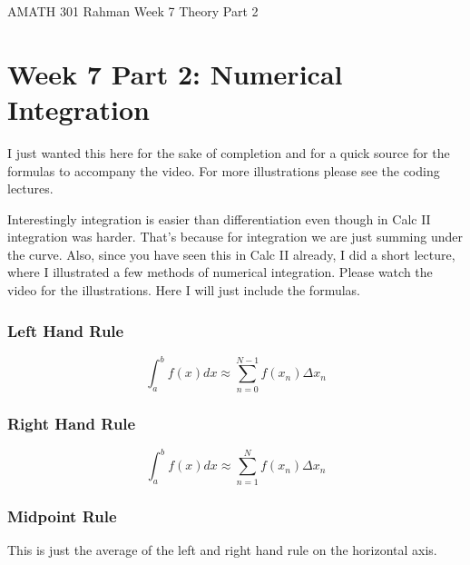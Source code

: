 \documentclass[reqno]{amsart}
\theoremstyle{definition}
\begin{document}
\begin{flushleft}
{\sc \Large AMATH 301 Rahman} \hfill Week 7 Theory Part 2
\bigskip
\end{flushleft}

\newcommand{\R}{\mathbb{R}}
\newcommand{\N}{\mathbb{N}}
\newcommand{\Z}{\mathbb{Z}}
\newcommand{\Q}{\mathbb{Q}}
\renewcommand{\CancelColor}{\color{red}}
\newcommand{\?}{\stackrel{?}{=}}
\renewcommand{\varphi}{\phi}
\newcommand{\card}{\text{Card}}
\newcommand{\bigzero}{\text{\Huge 0}}
\newcommand{\curvearrowdown}{{\color{red}\rotatebox{90}{$\curvearrowleft$}}}
\newcommand{\curvearrowup}{{\color{red}\rotatebox{90}{$\curvearrowright$}}}



\section*{Week 7 Part 2:  Numerical Integration}


I just wanted this here for the sake of completion and for a quick source for the formulas to accompany the video.  For more illustrations please see the coding lectures.

Interestingly integration is easier than differentiation even though in Calc II integration was harder.  That's because for integration we are just summing under the curve.  Also, since you have seen this in Calc II already, I did a short lecture, where I illustrated a few methods of numerical integration.  Please watch the video for the illustrations.  Here I will just include the formulas.

\subsubsection*{Left Hand Rule}

\begin{equation}
\int_a^b f(x)dx \approx \sum_{n=0}^{N-1} f(x_n)\Delta x_n
\end{equation}

\subsubsection*{Right Hand Rule}

\begin{equation}
\int_a^b f(x)dx \approx \sum_{n=1}^N f(x_n)\Delta x_n
\end{equation}

\subsubsection*{Midpoint Rule}
This is just the average of the left and right hand rule on the horizontal axis.
\end{document}
